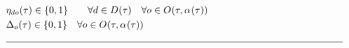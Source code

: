 \begin{alignat}{2}
	& \VarTacticalWorkBinaryConsecutive \in \{0, 1\}\quad                                                                                                                                                                                                               \quad \forall \ElementDays \in \SetDays{} \quad \forall \ElementOperation \in \SetOperation{}{\VarStrategicWorkOrderAssignment{}{}}                                                                                                                                                        \\
	& \VarTacticalOperationDifference \in \{0, 1\}                                                                                                                                                                                                                              \quad \forall \ElementOperation \in \SetOperation{}{\VarStrategicWorkOrderAssignment{}{}}\\
	& \text{\rule{\linewidth}{0.4pt}} \notag
\end{alignat}
\newpage


